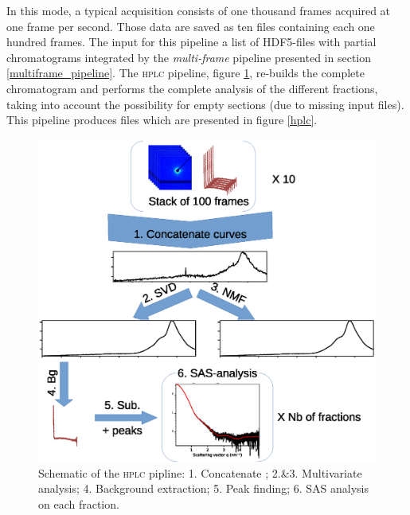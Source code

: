 \documentclass[preprint]{iucr}              %
\begin{document}
In this mode, a typical acquisition consists of one thousand frames acquired at one frame per second.
Those data are saved as ten files containing each one hundred frames.
The input for this pipeline a list of HDF5-files with partial chromatograms integrated by the \textit{multi-frame} pipeline presented in section \ref{multiframe_pipeline}. 
The \textsc{hplc} pipeline, figure \ref{hplc_worflow}, re-builds the complete chromatogram and performs the complete analysis of the different fractions, taking into account the possibility for empty sections (due to missing input files).
This pipeline produces files which are presented in figure \ref{hplc}.
\begin{figure}
    \label{hplc_worflow}
    \includegraphics[width=12cm]{HPLC_pipeline.eps}
    \caption{Schematic of the \textsc{hplc} pipline: 
    1. Concatenate ;
    2.\&3. Multivariate analysis;
    4. Background extraction;
    5. Peak finding;
    6. SAS analysis on each fraction.}
\end{figure}
\end{document}
